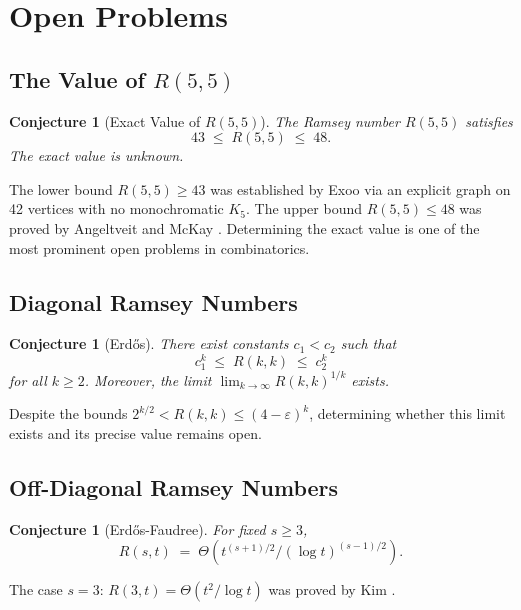 \documentclass[12pt,a4paper]{amsart}
\newtheorem{conjecture}[theorem]{Conjecture}
\theoremstyle{definition}
\theoremstyle{remark}
\begin{document}
\section{Open Problems}

\subsection{The Value of \texorpdfstring{$R(5,5)$}{R(5,5)}}

\begin{conjecture}[Exact Value of $R(5,5)$]\label{conj:r55}
The Ramsey number $R(5,5)$ satisfies
\[
  43 \;\le\; R(5,5) \;\le\; 48.
\]
The exact value is unknown.
\end{conjecture}

The lower bound $R(5,5) \ge 43$ was established by Exoo \cite{Exoo1989} via an
explicit graph on 42 vertices with no monochromatic $K_5$.  The upper bound
$R(5,5) \le 48$ was proved by Angeltveit and McKay \cite{AngeltveitMcKay2017}.
Determining the exact value is one of the most prominent open problems in
combinatorics.

\subsection{Diagonal Ramsey Numbers}

\begin{conjecture}[Erd\H{o}s]\label{conj:diagonal}
There exist constants $c_1 < c_2$ such that
\[
  c_1^k \;\le\; R(k,k) \;\le\; c_2^k
\]
for all $k \ge 2$.  Moreover, the limit $\lim_{k\to\infty} R(k,k)^{1/k}$ exists.
\end{conjecture}

Despite the bounds $2^{k/2} < R(k,k) \le (4-\varepsilon)^k$, determining whether
this limit exists and its precise value remains open.

\subsection{Off-Diagonal Ramsey Numbers}

\begin{conjecture}[Erd\H{o}s-Faudree]\label{conj:offdiag}
For fixed $s \ge 3$,
\[
  R(s,t) \;=\; \Theta\!\left(t^{(s+1)/2} / (\log t)^{(s-1)/2}\right).
\]
\end{conjecture}

The case $s=3$: $R(3,t) = \Theta(t^2/\log t)$ was proved by Kim \cite{Kim1995}.
\end{document}
